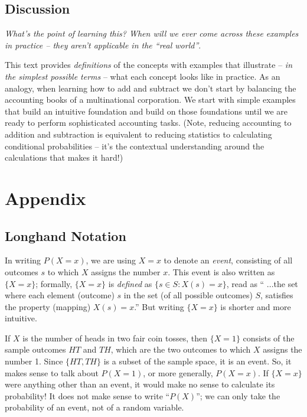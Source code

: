 \documentclass[11pt,a4paper]{article}
\begin{document}
\subsection{Discussion}
\emph{What's the point of learning this? When will we ever come across
these examples in practice -- they aren't applicable in the ``real world''}.

This text provides \emph{definitions} of the concepts with examples that
illustrate -- \emph{in the simplest possible terms} -- what each concept looks like in practice. 
As an analogy, 
when learning how to add and subtract we don't start by 
balancing the accounting books of a multinational corporation. 
We start with simple examples that build an intuitive foundation and build on those 
foundations until we are ready to perform sophisticated accounting tasks. 
(Note, reducing accounting to addition and subtraction is equivalent to reducing 
statistics to calculating conditional probabilities 
-- it's the contextual understanding around the calculations that makes it hard!)

\section{Appendix}

\subsection{Longhand Notation}

In writing \(P(X = x)\), 
we are using \(X = x\) to denote an \emph{event}, 
consisting of all outcomes \(s\) to which \(X\) assigns the number \(x\). 
This event is also written as \(\{ X = x\}\);
formally, \(\{ X = x\}\) is \emph{defined} as \(\{s \in S: X(s) = x\}\), 
read as `` ...the set where each element (outcome) \(s\) in the set (of all possible outcomes) \(S\), 
satisfies the property (mapping) \(X(s) = x\).'' 
But writing \(\{ X = x\}\) is shorter and more intuitive. 

If \(X\) is the number of heads in two fair coin tosses, 
then \(\{ X = 1\}\) consists of the sample outcomes \(HT\) and \(TH\), 
which are the two outcomes to which \(X\) assigns the number 1. 
Since \(\{HT, TH\}\) is a subset of the sample space, 
it is an event. 
So, it makes sense to talk about \(P(X = 1)\), 
or more generally, \(P(X = x)\). 
If \(\{ X = x\}\) were anything other than an event, 
it would make no sense to calculate its probability! 
It does not make sense to write ``\(P(X)\)''; 
we can only take the probability of an event, 
not of a random variable.
\end{document}
